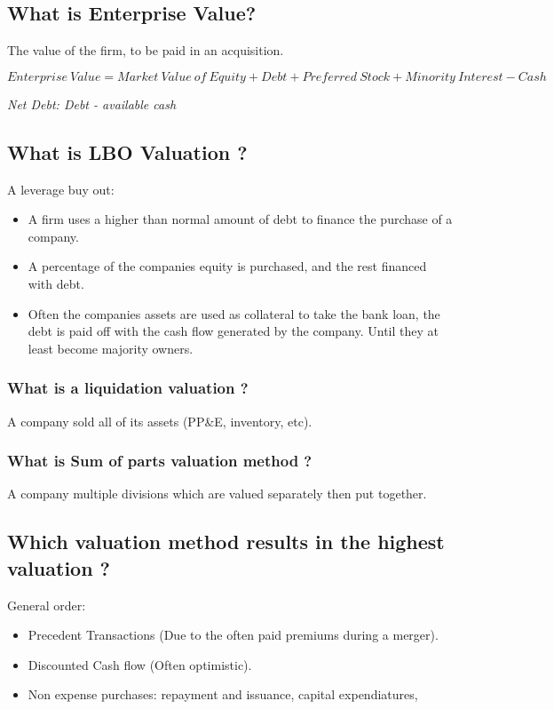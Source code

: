 \documentclass[11pt]{scrartcl} %
\begin{document}
\subsection{What is Enterprise Value?}

The value of the firm, to be paid in an acquisition.

\[ Enterprise\:Value = Market\:Value\:of\:Equity + Debt + Preferred\:Stock + Minority\:Interest - Cash \]

\textit{Net Debt: Debt - available cash}

\subsection{What is LBO Valuation ?}

A leverage buy out:

\begin{itemize}
	\item A firm uses a higher than normal amount of debt to finance the purchase of a company.
	\item A percentage of the companies equity is purchased, and the rest financed with debt.
	\item Often the companies assets are used as collateral to take the bank loan, the debt is paid off with the cash flow generated by the company. Until they at least become majority owners.
\end{itemize}
 
\subsubsection{What is a liquidation valuation ?}

A company sold all of its assets (PP\&E, inventory, etc).
  
\subsubsection{What is Sum of parts valuation method ?}

A company multiple divisions which are valued separately then put together.

\subsection{Which valuation method results in the highest valuation ?}

General order:

\begin{itemize}
	\item Precedent Transactions (Due to the often paid premiums during a merger).
	\item Discounted Cash flow (Often optimistic).
	\item Non expense purchases:  repayment and issuance, capital expendiatures, 
\end{itemize}
\end{document}
